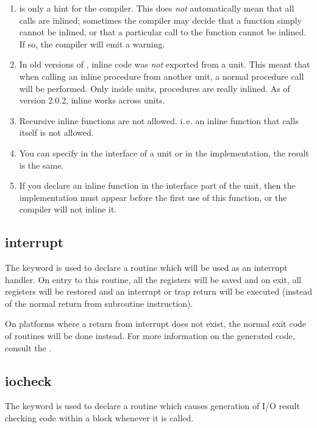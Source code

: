 \begin{remark}
\begin{enumerate}
\item {} is only a hint for the compiler. This does {\em not}
automatically mean that all calls are inlined; sometimes the compiler
may decide that a function simply cannot be inlined, or that a particular call
to the function cannot be inlined. If so, the compiler will emit a warning.
\item In old versions of \fpc, inline code was {\em not} exported from a unit. This
meant that when calling an inline procedure from another unit, a normal procedure
call will be performed. Only inside units,  procedures are really inlined.
As of version 2.0.2, inline works across units.
\item Recursive inline functions are not allowed. i.\,e. an inline function
that calls itself is not allowed.
\item You can specify  in the interface of a unit or in the
implementation, the result is the same.
\item If you declare an inline function in the interface part of the unit,
then the implementation must appear before the first use of this function, or
the compiler will not inline it.
\end{enumerate}
\end{remark}

\subsection{interrupt}
\label{se:interrupt}
The  keyword is used to declare a routine which will
be used as an interrupt handler. On entry to this routine, all the registers
will be saved and on exit, all registers will be restored
and an interrupt or trap return will be executed (instead of the normal return
from subroutine instruction).

On platforms where a return from interrupt does not exist, the normal exit
code of routines will be done instead. For more information on the generated
code, consult the \progref.

\subsection{iocheck}
\label{se:iocheck}
The  keyword is used to declare a routine which causes
generation of I/O result checking code within a 
block whenever it is called.


